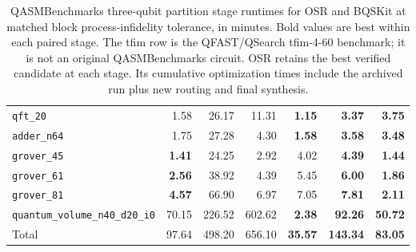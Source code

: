 \begin{table}[p]
\begin{tabular}{l|rrr|rrr}
\texttt{qft\_20} & 1.58 & 26.17 & 11.31 & \textbf{1.15} & \textbf{3.37} & \textbf{3.75} \\
\texttt{adder\_n64} & 1.75 & 27.28 & 4.30 & \textbf{1.58} & \textbf{3.58} & \textbf{3.48} \\
\texttt{grover\_45} & \textbf{1.41} & 24.25 & 2.92 & 4.02 & \textbf{4.39} & \textbf{1.44} \\
\texttt{grover\_61} & \textbf{2.56} & 38.92 & 4.39 & 5.45 & \textbf{6.00} & \textbf{1.86} \\
\texttt{grover\_81} & \textbf{4.57} & 66.90 & 6.97 & 7.05 & \textbf{7.81} & \textbf{2.11} \\
\texttt{quantum\_volume\_n40\_d20\_i0} & 70.15 & 226.52 & 602.62 & \textbf{2.38} & \textbf{92.26} & \textbf{50.72} \\
\hline
Total & 97.64 & 498.20 & 656.10 & \textbf{35.57} & \textbf{143.34} & \textbf{83.05} \\
\hline
\end{tabular}
\caption{QASMBenchmarks three-qubit partition stage runtimes for OSR and BQSKit at matched block process-infidelity tolerance, in minutes. Bold values are best within each paired stage. The tfim row is the QFAST/QSearch tfim-4-60 benchmark; it is not an original QASMBenchmarks circuit. OSR retains the best verified candidate at each stage. Its cumulative optimization times include the archived run plus new routing and final synthesis.}
\label{tab:osr-bqskit-three-qubit-qasm-benchmarks-times}
\end{table}

